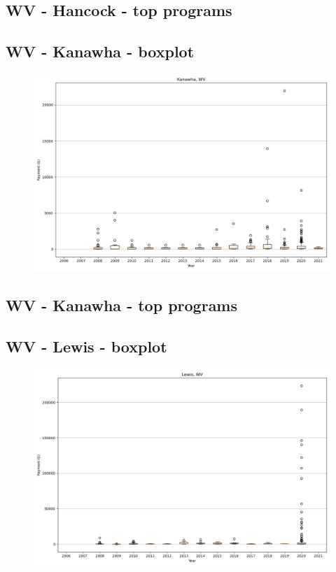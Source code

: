 \subsection*{WV - Hancock - top programs}

\newpage
\subsection*{WV - Kanawha - boxplot}
\begin{figure}[h]
\centering
\includegraphics[width=7in]{../output/boxplots/counties/Kanawha-WV_boxplot.png}
\end{figure}


\subsection*{WV - Kanawha - top programs}

\newpage
\subsection*{WV - Lewis - boxplot}
\begin{figure}[h]
\centering
\includegraphics[width=7in]{../output/boxplots/counties/Lewis-WV_boxplot.png}
\end{figure}


